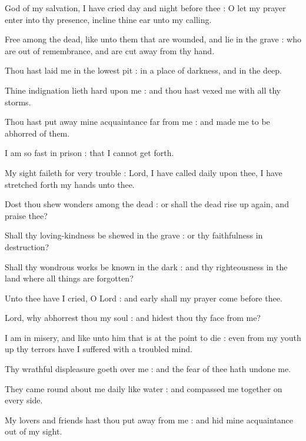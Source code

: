  God of my salvation, I have cried day and night before thee : O let my prayer enter into thy presence, incline thine ear unto my calling.\par
{}
Free among the dead, like unto them that are wounded, and lie in the grave : who are out of remembrance, and are cut away from thy hand.\par
{}Thou hast laid me in the lowest pit : in a place of darkness, and in the deep.\par
{}Thine indignation lieth hard upon me : and thou hast vexed me with all thy storms.\par
{}Thou hast put away mine acquaintance far from me : and made me to be abhorred of them.\par
{}I am so fast in prison : that I cannot get forth.\par
{}My sight faileth for very trouble : Lord, I have called daily upon thee, I have stretched forth my hands unto thee.\par
{}Dost thou shew wonders among the dead : or shall the dead rise up again, and praise thee?\par
{}Shall thy loving-kindness be shewed in the grave : or thy faithfulness in destruction?\par
{}Shall thy wondrous works be known in the dark : and thy righteousness in the land where all things are forgotten?\par
{}Unto thee have I cried, O Lord : and early shall my prayer come before thee.\par
{}Lord, why abhorrest thou my soul : and hidest thou thy face from me?\par
{}I am in misery, and like unto him that is at the point to die : even from my youth up thy terrors have I suffered with a troubled mind.\par
{}Thy wrathful displeasure goeth over me : and the fear of thee hath undone me.\par
{}They came round about me daily like water : and compassed me together on every side.\par
{}My lovers and friends hast thou put away from me : and hid mine acquaintance out of my sight.\par

